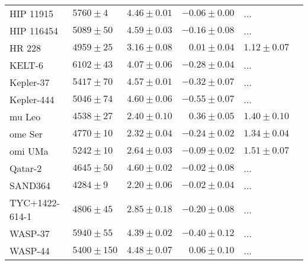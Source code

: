 \documentclass[fleqn]{fcup-thesis}
\newcommand{\object}[1]{#1}
\begin{document}
\begin{landscape}
\begin{longtable}{lllrll}
      \object{HIP 11915}       &    $5760 \pm   4$   &    $4.46 \pm 0.01$   &    $-0.06 \pm 0.00$   &          ...         &    \citet{Bedell2015}       \\
      \object{HIP 116454}      &    $5089 \pm  50$   &    $4.59 \pm 0.03$   &    $-0.16 \pm 0.08$   &          ...         &    \citet{Vanderburg2015}   \\
      \object{HR 228}          &    $4959 \pm  25$   &    $3.16 \pm 0.08$   &    $ 0.01 \pm 0.04$   &    $1.12 \pm 0.07$   &    \citet{Sato2013b}        \\
      \object{KELT-6}          &    $6102 \pm  43$   &    $4.07 \pm 0.06$   &    $-0.28 \pm 0.04$   &          ...         &    \citet{Collins2014}      \\
      \object{Kepler-37}       &    $5417 \pm  70$   &    $4.57 \pm 0.01$   &    $-0.32 \pm 0.07$   &          ...         &    \citet{Barclay2013}      \\
      \object{Kepler-444}      &    $5046 \pm  74$   &    $4.60 \pm 0.06$   &    $-0.55 \pm 0.07$   &          ...         &    \citet{Campante2015}     \\
      \object{mu Leo}          &    $4538 \pm  27$   &    $2.40 \pm 0.10$   &    $ 0.36 \pm 0.05$   &    $1.40 \pm 0.10$   &    \citet{Lee2014}          \\
      \object{ome Ser}         &    $4770 \pm  10$   &    $2.32 \pm 0.04$   &    $-0.24 \pm 0.02$   &    $1.34 \pm 0.04$   &    \citet{Sato2013}         \\
      \object{omi UMa}         &    $5242 \pm  10$   &    $2.64 \pm 0.03$   &    $-0.09 \pm 0.02$   &    $1.51 \pm 0.07$   &    \citet{Sato2012}         \\
      \object{Qatar-2}         &    $4645 \pm  50$   &    $4.60 \pm 0.02$   &    $-0.02 \pm 0.08$   &          ...         &    \citet{Bryan2012}        \\
      \object{SAND364}         &    $4284 \pm   9$   &    $2.20 \pm 0.06$   &    $-0.02 \pm 0.04$   &          ...         &    \citet{Brucalassi2014}   \\
      \object{TYC+1422-614-1}  &    $4806 \pm  45$   &    $2.85 \pm 0.18$   &    $-0.20 \pm 0.08$   &          ...         &    \citet{Niedzielski2015a} \\
      \object{WASP-37}         &    $5940 \pm  55$   &    $4.39 \pm 0.02$   &    $-0.40 \pm 0.12$   &          ...         &    \citet{Simpson2011}      \\
      \object{WASP-44}         &    $5400 \pm 150$   &    $4.48 \pm 0.07$   &    $ 0.06 \pm 0.10$   &          ...         &    \citet{Anderson2012}     \\

\end{longtable}
\end{landscape}
\end{document}

